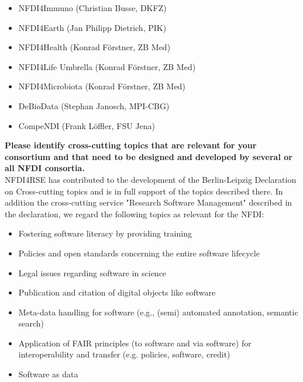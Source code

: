 \documentclass[11pt,a4paper,DIV=11]{scrlttr2}
\begin{document}
\begin{letter}{}
\begin{itemize}
\begin{itemize}
 \setlength\itemsep{0em}
 \item NFDI4Immuno (Christian Busse, DKFZ)
 \item NFDI4Earth (Jan Philipp Dietrich, PIK)
 \item NFDI4Health (Konrad Förstner, ZB Med)
 \item NFDI4Life Umbrella (Konrad Förstner, ZB Med)
 \item NFDI4Microbiota (Konrad Förstner, ZB Med)
 \item DeBioData (Stephan Janosch, MPI-CBG)
 \item CompeNDI (Frank Löffler, FSU Jena)
\end{itemize}
\end{itemize}


\textbf{Please identify cross-cutting topics that are relevant for your consortium and that
need to be designed and developed by several or all NFDI consortia.}\\
NFDI4RSE has contributed to the development of the Berlin-Leipzig Declaration on Cross-cutting topics and is in full support of the topics described there. In addition the cross-cutting service "Research Software Management" described in the declaration, we regard the following topics as relevant for the NFDI:
\begin{itemize}
\item Fostering software literacy by providing training
\item Policies and open standards concerning the entire software lifecycle
\item Legal issues regarding software in science
\item Publication and citation of digital objects like software
\item Meta-data handling for software (e.g., (semi) automated annotation, semantic search)
\item Application of FAIR principles (to software and via software) for interoperability and transfer (e.g. policies, software, credit)
\item Software as data 
\end{itemize}


\end{letter}
\end{document}
